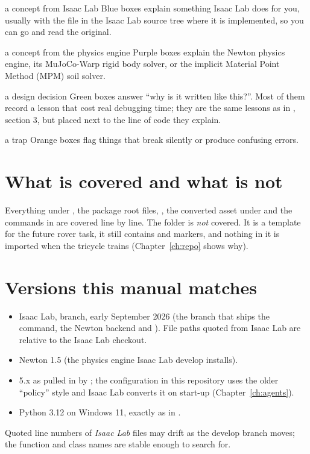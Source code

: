 \begin{isaacbox}{a concept from Isaac Lab}
Blue boxes explain something Isaac Lab does for you, usually with the
file in the Isaac Lab source tree where it is implemented, so you can go and
read the original.
\end{isaacbox}

\begin{newtonbox}{a concept from the physics engine}
Purple boxes explain the Newton physics engine, its MuJoCo-Warp rigid body
solver, or the implicit Material Point Method (MPM) soil solver.
\end{newtonbox}

\begin{whybox}{a design decision}
Green boxes answer ``why is it written like this?''. Most of them record a
lesson that cost real debugging time; they are the same lessons as in
, section 3, but placed next to the line of code they
explain.
\end{whybox}

\begin{warnbox}{a trap}
Orange boxes flag things that break silently or produce confusing errors.
\end{warnbox}

\section*{What is covered and what is not}

Everything under , the package root files,
, the converted asset under  and
the commands in  are covered line by line. The
 folder is \emph{not} covered. It is a
template for the future rover task, it still contains  and
 markers, and nothing in it is imported when the tricycle trains
(Chapter~\ref{ch:repo} shows why).

\section*{Versions this manual matches}

\begin{itemize}[leftmargin=1.6em]
  \item Isaac Lab,  branch, early September 2026 (the branch
        that ships the  command, the Newton backend and
        ). File paths quoted from Isaac Lab
        are relative to the Isaac Lab checkout.
  \item Newton 1.5 (the physics engine Isaac Lab develop installs).
  \item {} 5.x as pulled in by ; the
        configuration in this repository uses the older ``policy'' style and
        Isaac Lab converts it on start-up (Chapter~\ref{ch:agents}).
  \item Python 3.12 on Windows 11, exactly as in .
\end{itemize}

Quoted line numbers of \emph{Isaac Lab} files may drift as the develop branch
moves; the function and class names are stable enough to search for.
